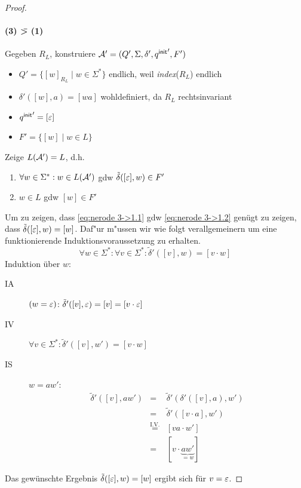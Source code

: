 \begin{proof}
\paragraph{(3) \=> (1)} Gegeben $R_L$, konstruiere $\mathcal{A}'=(Q',\Sigma,\delta',{q^\mathsf{init}}',F')$
    \begin{itemize}
    \item $Q' = \{ [w]_{R_L} \mid w\in \Sigma^* \}$ \quad endlich, weil \textit{index}($R_L$) endlich
    \item $\delta'([w],a) = [wa]$ wohldefiniert, da $R_L$ rechtsinvariant
    \item ${q^\mathsf{init}}' = [\varepsilon]$
    \item $F' = \{ [w] \mid w\in L \}$
    \end{itemize}
    Zeige $L(\mathcal{A}')=L$, d.h.
    \begin{enumerate}
    \item \label{eq:nerode 3->1.1} $\forall w\in \Sigma^* : w\in L(\mathcal{A}')$ gdw $\tilde\delta([\varepsilon],w)\in F'$
    \item \label{eq:nerode 3->1.2} $w\in L$ gdw $[w]\in F'$ 
    \end{enumerate}
    
    Um zu zeigen, dass \ref{eq:nerode 3->1.1} gdw \ref{eq:nerode 3->1.2} genügt zu zeigen, dass $\tilde\delta([\varepsilon], w) = [w]$.
                Daf"ur m"ussen wir wie folgt verallgemeinern um eine funktionierende Induktionsvoraussetzung zu erhalten.
    \begin{displaymath}
      \forall w\in\Sigma^* :
                        \forall v\in\Sigma^* : \tilde\delta'([v],w) = [v\cdot w]
    \end{displaymath}
    Induktion über $w$:
    \begin{description}
    \item[IA] $(w = \varepsilon)$: $\tilde\delta'([v],\varepsilon) = [v]=[v\cdot\varepsilon]$
    \item[IV] 
      $\forall v\in\Sigma^* : \tilde\delta'([v],w') = [v\cdot w]$
    \item [IS] $w = aw'$:
      \begin{displaymath}
        \begin{array}{lcl}
        \tilde\delta'([v],aw') &=& \tilde\delta'(\delta'([v],a),w') \\
                             &=& \tilde\delta'([v\cdot a],w') \\
                             &\stackrel{\text{I.V.}}{=}&[va\cdot w'] \\
                             &=& [v\cdot \underbrace{aw'}_{=w}]
        \end{array}
      \end{displaymath}
    \end{description}
                Das gewünschte Ergebnis $\tilde\delta([\varepsilon], w) = [w]$ ergibt sich für $v=\varepsilon$. \qedhere
\end{proof}
